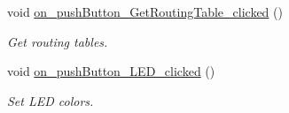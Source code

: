 \begin{DoxyCompactItemize}
void \hyperlink{classMainWindow_a4c69446fb6a0d787f8901333eec2ce3a}{on\+\_\+push\+Button\+\_\+\+Get\+Routing\+Table\+\_\+clicked} ()
\begin{DoxyCompactList}\small\item\em Get routing tables. \end{DoxyCompactList}\item 
\mbox{\label{classMainWindow_a30ae116f22bf182d4aec0fe7776e6144}} 
void \hyperlink{classMainWindow_a30ae116f22bf182d4aec0fe7776e6144}{on\+\_\+push\+Button\+\_\+\+L\+E\+D\+\_\+clicked} ()
\begin{DoxyCompactList}\small\item\em Set L\+ED colors. \end{DoxyCompactList}\end{DoxyCompactItemize}
